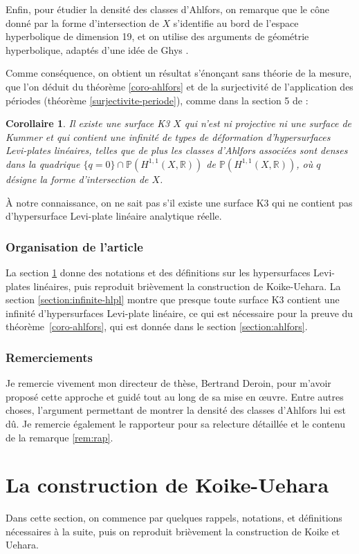 \documentclass[JEP,XML,SOM,Unicode,francais,published]{cedram}
\newcommand{\R}{\mathbb{R}}
\newtheorem{coro}[thm]{Corollaire}
\theoremstyle{definition}
\begin{document}
Enfin, pour étudier la densité des classes d'Ahlfors, on remarque que le cône donné par la forme d'intersection de $X$ s'identifie au bord de l'espace hyperbolique de dimension 19, et on utilise des arguments de géométrie hyperbolique, adaptés d'une idée de Ghys \cite{ghys1995topologie}.

Comme conséquence, on obtient un résultat s'énonçant sans théorie de la mesure, que l'on déduit du théorème \ref{coro-ahlfors} et de la surjectivité de l'application des périodes (théorème \ref{surjectivite-periode}), comme dans la section 5 de \cite{koike2019gluing}:
\begin{coro}
Il existe une surface K3 $X$ qui n'est ni projective ni une surface de Kummer et qui contient une infinité de types de déformation d'hypersurfaces Levi-plates linéaires, telles que de plus les classes d'Ahlfors associées sont denses dans la quadrique $\{q = 0\} \cap \mathbb{P}(H^{1, 1}(X, \R))$ de $\mathbb{P}(H^{1, 1}(X, \R))$, où $q$ désigne la forme d'intersection de $X$.
\end{coro}
À notre connaissance, on ne sait pas s'il existe une surface K3 qui ne contient pas d'hypersurface Levi-plate linéaire analytique réelle.

\subsubsection*{Organisation de l'article} La section \ref{section:debut} donne des notations et des définitions sur les hypersurfaces Levi-plates linéaires, puis reproduit brièvement la construction de Koike-Uehara. La section \ref{section:infinite-hlpl} montre que presque toute surface K3 contient une infinité d'hypersurfaces Levi-plate linéaire, ce qui est nécessaire pour la preuve du théorème~\ref{coro-ahlfors}, qui est donnée dans le section \ref{section:ahlfors}.
\subsubsection*{Remerciements} Je remercie vivement mon directeur de thèse, Bertrand Deroin, pour m'avoir proposé cette approche et guidé tout au long de sa mise en œuvre. Entre autres choses, l'argument permettant de montrer la densité des classes d'Ahlfors lui est dû. Je remercie également le rapporteur pour sa relecture détaillée et le contenu de la remarque \ref{rem:rap}.
\section{La construction de Koike-Uehara}
\label{section:debut}
Dans cette section, on commence par quelques rappels, notations, et définitions nécessaires à la suite, puis on reproduit brièvement la construction de Koike et Uehara.
\end{document}
